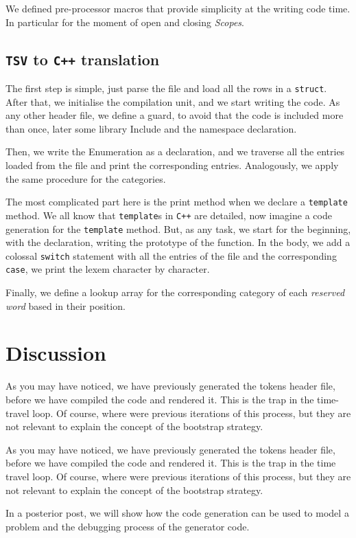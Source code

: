 \documentclass{article}
\begin{document}
We defined pre-processor macros that provide simplicity at the writing code time. In particular for the moment of open and closing \textit{Scopes}.


\subsection{\texttt{TSV} to \texttt{C++} translation}

The first step is simple, just parse the file and load all the rows in a \texttt{struct}. After that, we initialise the compilation unit, and we start writing the code. As any other header file, we define a guard, to avoid that the code is included more than once, later some library Include and the namespace declaration.

Then, we write the Enumeration as a declaration, and we traverse all the entries loaded from the file and print the corresponding entries.  Analogously, we apply the same procedure for the categories.

The most complicated part here is the print method when we declare a \texttt{template} method. We all know that \texttt{template}s in \texttt{C++} are detailed, now imagine a code generation for the \texttt{template} method. But, as any task, we start for the beginning, with the declaration, writing the prototype of the function. In the body, we add a colossal \texttt{switch} statement with all the entries of the file and the corresponding \texttt{case}, we print the lexem character by character.

Finally, we define a lookup array for the corresponding category of each \textit{reserved word} based in their position.

\section{Discussion}

As you may have noticed, we have previously generated the tokens header file, before we have compiled the code and rendered it. This is the trap in the time-travel loop.  Of course, where were previous iterations of this process, but they are not relevant to explain the concept of the bootstrap strategy.

As you may have noticed, we have previously generated the tokens header file, before we have compiled the code and rendered it. This is the trap in the time travel loop.  Of course, where were previous iterations of this process, but they are not relevant to explain the concept of the bootstrap strategy. 

In a posterior post, we will show how the code generation can be used to model a problem and the debugging process of the generator code. 
\end{document}
